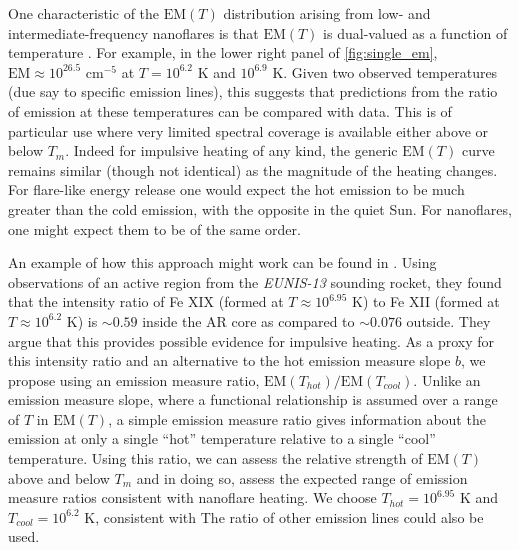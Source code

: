 \documentclass[preprint,linenumbers]{aastex}
\begin{document}
	\par One characteristic of the $\mathrm{EM}(T)$ distribution arising from low- and intermediate-frequency nanoflares is that $\mathrm{EM}(T)$ is dual-valued as a function of temperature \citep[see \autoref{fig:single_em}-\autoref{fig:ion_em} and][]{cargill_implications_1994}. For example, in the lower right panel of \autoref{fig:single_em}, $\mathrm{EM}\approx 10^{26.5}$ cm$^{-5}$ at $T = 10^{6.2}$ K and $10^{6.9}$ K. Given two observed temperatures (due say to specific emission lines), this suggests that predictions from the ratio of emission at these temperatures can be compared with data. This is of particular use where very limited spectral coverage is available either above or below $T_m$. Indeed for impulsive heating of any kind, the generic $\mathrm{EM}(T)$ curve remains similar (though not identical) as the magnitude of the heating changes. For flare-like energy release one would expect the hot emission to be much greater than the cold emission, with the opposite in the quiet Sun. For nanoflares, one might expect them to be of the same order.
	\par An example of how this approach might work can be found in \citet{brosius_pervasive_2014}. Using observations of an active region from the \textit{EUNIS-13} sounding rocket, they found that the intensity ratio of Fe XIX (formed at $T\approx10^{6.95}$ K) to Fe XII (formed at $T\approx10^{6.2}$ K) is $\sim0.59$ inside the AR core as compared to $\sim0.076$ outside. They argue that this provides possible evidence for impulsive heating. As a proxy for this intensity ratio and an alternative to the hot emission measure slope $b$, we propose using an emission measure ratio, $\mathrm{EM}(T_{hot})/\mathrm{EM}(T_{cool})$. Unlike an emission measure slope, where a functional relationship is assumed over a range of $T$ in $\mathrm{EM}(T)$, a simple emission measure ratio gives information about the emission at only a single ``hot'' temperature relative to a single ``cool'' temperature. Using this ratio, we can assess the relative strength of $\mathrm{EM}(T)$ above and below $T_m$ and in doing so, assess the expected range of emission measure ratios consistent with nanoflare heating. We choose $T_{hot}=10^{6.95}$ K and $T_{cool}=10^{6.2}$ K, consistent with \citet{brosius_pervasive_2014} The ratio of other emission lines could also be used. 
\end{document}
